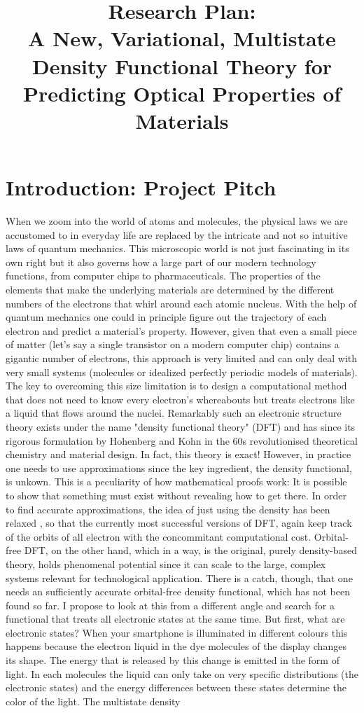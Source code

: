 \documentclass[12pt]{article}
\title{\centering Research Plan:\\ A New, Variational, Multistate Density Functional Theory for Predicting Optical Properties of Materials}
\date{\vspace{-3ex}}
\begin{document}
\maketitle

\section{Introduction: Project Pitch}
When we zoom into the world of atoms and molecules, the physical laws we are accustomed to in everyday life are replaced by the intricate and not so intuitive laws of quantum mechanics. This microscopic world is not just fascinating in its own right but it also governs how a large part of our modern technology functions, from computer chips to pharmaceuticals. The properties of the elements that make the underlying materials are determined by the different numbers of the electrons that whirl around each atomic nucleus. With the help of quantum mechanics one could in principle figure out the trajectory of each electron and predict a material's property. However, given that even a small piece of matter (let's say a single transistor on a modern computer chip) contains a gigantic number of electrons, this approach is very limited and can only deal with very small systems (molecules or idealized perfectly periodic models of materials). The key to overcoming this size limitation is to design a computational method that does not need to know every electron's whereabouts but treats electrons like a liquid that flows around the nuclei. Remarkably such an electronic structure theory exists under the name "density functional theory" (DFT) and has since its rigorous formulation by Hohenberg and Kohn \cite{Hohenberg1964inhomogeneous} in the 60s revolutionised theoretical chemistry and material design. In fact, this theory is exact! However, in practice one needs to use approximations since the key ingredient, the density functional, is unkown. This is a peculiarity of how mathematical proofs work: It is possible to show that something must exist without revealing how to get there. In order to find accurate approximations, the idea of just using the density has been relaxed \cite{Kohn1965}, so that the currently most successful versions of DFT, again keep track of the orbits of all electron with the concommitant computational cost. Orbital-free DFT, on the other hand, which in a way, is the original, purely density-based theory, holds phenomenal potential since it can scale to the large, complex systems relevant for technological application. There is a catch, though, that one needs an sufficiently accurate orbital-free density functional, which has not been found so far. I propose to look at this from a different angle and search for a functional that treats all electronic states at the same time. But first, what are electronic states? When your smartphone is illuminated in different colours this happens because the electron liquid in the dye molecules of the display changes its shape. The energy that is released by this change is emitted in the form of light. In each molecules the liquid can only take on very specific distributions (the electronic states) and the energy differences between these states determine the color of the light. The multistate density 
\end{document}
